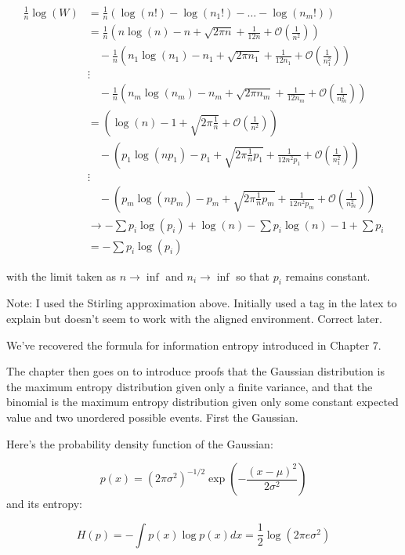 \documentclass[
]{book}
\begin{document}
\[
\begin{aligned}
\frac{1}{n} \log(W) &= \frac{1}{n} \left( \log(n!) - \log(n_1!) - \dots - \log(n_m!) \right) \\
 &= \frac{1}{n} \left( n \log(n) - n + \sqrt{2 \pi n} + \frac{1}{12n} + \mathcal{O}\left(\frac{1}{n^2}\right) \right) \\ 
 &\quad - \frac{1}{n} \left( n_1 \log(n_1) - n_1 + \sqrt{2 \pi n_1} + \frac{1}{12n_1} + \mathcal{O}\left(\frac{1}{n_1^2}\right)  \right) \\
 &\vdots \\
 &\quad- \frac{1}{n} \left( n_m \log(n_m) - n_m + \sqrt{2 \pi n_m} + \frac{1}{12n_m} + \mathcal{O}\left(\frac{1}{n_m^2}\right)  \right)  \\
 &= \left( \log(n) - 1 + \sqrt{2 \pi \frac{1}{n}} + \mathcal{O}\left(\frac{1}{n^2}\right) \right) \\ 
 &\quad- \left( p_1 \log(np_1) - p_1 + \sqrt{2 \pi \frac{1}{n}p_1} + \frac{1}{12n^2p_1} + \mathcal{O}\left(\frac{1}{n_1^2}\right)  \right) \\
 &\vdots \\
 &\quad- \left( p_m \log(np_m) - p_m + \sqrt{2 \pi \frac{1}{n}p_m} + \frac{1}{12n^2p_m} + \mathcal{O}\left(\frac{1}{n_m^2}\right)  \right) \\
 &\to -\sum p_i \log(p_i) +\log(n) -\sum p_i \log(n) - 1 + \sum p_i \\
 &= -\sum p_i \log(p_i)
\end{aligned}
\]

with the limit taken as \(n \to \inf\) and \(n_i \to \inf\) so that \(p_i\) remains constant.

Note: I used the Stirling approximation above. Initially used a tag in the latex to explain but doesn't seem to work with the aligned environment. Correct later.

We've recovered the formula for information entropy introduced in Chapter 7.

The chapter then goes on to introduce proofs that the Gaussian distribution is the maximum entropy distribution given only a finite variance, and that the binomial is the maximum entropy distribution given only some constant expected value and two unordered possible events. First the Gaussian.

Here's the probability density function of the Gaussian:

\[
p(x) = (2 \pi \sigma^2)^{-1/2} \exp \left( - \frac{(x- \mu)^2}{2 \sigma^2} \right)
\]
and its entropy:

\[
H(p) = - \int p(x) \log p(x) dx = \frac{1}{2} \log(2 \pi e \sigma^2) 
\]
\end{document}
